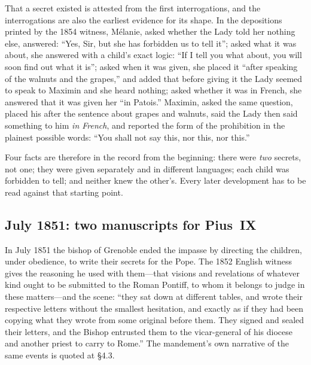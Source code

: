 That a secret existed is attested from the first interrogations, and
the interrogations are also the earliest evidence for its shape. In
the depositions printed by the 1854 witness, Mélanie, asked whether
the Lady told her nothing else, answered: ``Yes, Sir, but she has
forbidden us to tell it''; asked what it was about, she answered
with a child's exact logic: ``If I tell you what about, you will
soon find out what it is''; asked when it was given, she placed it
``after speaking of the walnuts and the grapes,'' and added that
before giving it the Lady seemed to speak to Maximin and she heard
nothing; asked whether it was in French, she answered that it was
given her ``in Patois.'' Maximin, asked the same question, placed
his after the sentence about grapes and walnuts, said the Lady then
said something to him \emph{in French}, and reported the form of the
prohibition in the plainest possible words: ``You shall not say
this, nor this, nor this.''

Four facts are therefore in the record from the beginning: there
were \emph{two} secrets, not one; they were given separately and in
different languages; each child was forbidden to tell; and neither
knew the other's. Every later development has to be read against
that starting point.

\subsection{July 1851: two manuscripts for Pius~IX}

In July 1851 the bishop of Grenoble ended the impasse by directing
the children, under obedience, to write their secrets for the Pope.
The 1852 English witness gives the reasoning he used with them---that
visions and revelations of whatever kind ought to be submitted to
the Roman Pontiff, to whom it belongs to judge in these matters---and
the scene: ``they sat down at different tables, and wrote their
respective letters without the smallest hesitation, and exactly as
if they had been copying what they wrote from some original before
them. They signed and sealed their letters, and the Bishop entrusted
them to the vicar-general of his diocese and another priest to carry
to Rome.'' The mandement's own narrative of the same events is
quoted at \S4.3.

